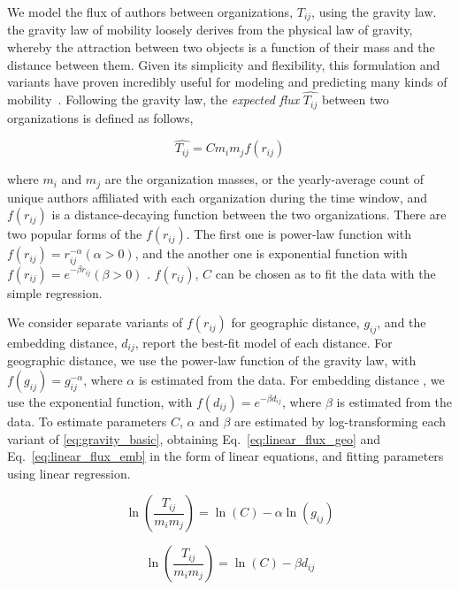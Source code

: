 \documentclass[12pt]{article} %
\begin{document}
We model the flux of authors between organizations, $T_{ij}$, using the gravity law.
the gravity law of mobility loosely derives from the physical law of gravity, whereby the attraction between two objects is a function of their mass and the distance between them.
Given its simplicity and flexibility, this formulation and variants have proven incredibly useful for modeling and predicting many kinds of mobility~\autocite{jung2008highwaygravity, curiel2018citygravity, lewer2008immigrationgravity, xia2005measlesgravity, truscott2012epidemicgravity, hong2016busgravity}.
Following the gravity law, the \textit{expected flux} $\hat{T_{ij}}$ between two organizations is defined as follows,

\begin{equation}
	\label{eq:gravity_basic}
	\hat{T_{ij}} = Cm_{i}m_{j}f(r_{ij})
\end{equation}

where $m_{i}$ and $m_{j}$ are the organization masses, or the yearly-average count of unique authors affiliated with each organization during the time window, and $f(r_{ij})$ is a distance-decaying function  between the two organizations. There are two popular forms of the $f(r_{ij})$. The first one is power-law function with $f(r_{ij})= r^{-\alpha}_{ij}  (\alpha > 0)$, and the another one is exponential function with $f(r_{ij}) = e^{-\beta r_{ij}} (\beta > 0)$ \autocite{chen2015distance}.  $f(r_{ij})$, $C$ can be chosen as to fit the data with the simple regression.

We consider separate variants of $f(r_{ij})$ for geographic distance, $g_{ij}$, and the embedding distance, $d_{ij}$, report the best-fit model of each distance.
For geographic distance, we use the power-law function of the gravity law, with $f(g_{ij})= g^{-\alpha}_{ij}$, where $\alpha$ is estimated from the data.
For embedding distance , we use the exponential function, with $f(d_{ij}) = e^{-\beta d_{ij}}$, where $\beta$ is estimated from the data.
To estimate parameters $C$, $\alpha$ and $\beta$ are estimated by log-transforming each variant of \ref{eq:gravity_basic}, obtaining Eq.~\ref{eq:linear_flux_geo} and Eq.~\ref{eq:linear_flux_emb} in the form of linear equations, and fitting parameters using linear regression.


\begin{equation}
	\label{eq:linear_flux_geo}
	\ln(\frac{T_{ij}}{m_im_j}) = \ln(C)  - \alpha \ln(g_{ij})
\end{equation}

\begin{equation}
	\label{eq:linear_flux_emb}
	\ln(\frac{T_{ij}}{m_im_j}) = \ln(C) - \beta d_{ij}
\end{equation}
\end{document}
